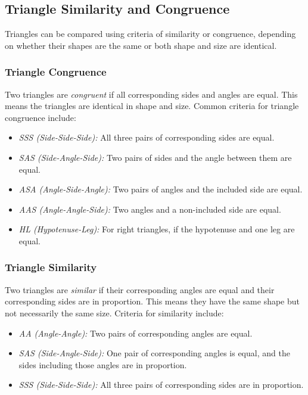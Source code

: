 \subsection{Triangle Similarity and Congruence}

Triangles can be compared using criteria of similarity or congruence, depending on whether their shapes 
are the same or both shape and size are identical.

\subsubsection{Triangle Congruence}

Two triangles are \emph{congruent} if all corresponding sides and angles are equal. This means the 
triangles are identical in shape and size. Common criteria for triangle congruence include:

\begin{itemize}

	\item \emph{SSS (Side-Side-Side):} All three pairs of corresponding sides are equal.

	\item \emph{SAS (Side-Angle-Side):} Two pairs of sides and the angle between them are equal.

	\item \emph{ASA (Angle-Side-Angle):} Two pairs of angles and the included side are equal.

	\item \emph{AAS (Angle-Angle-Side):} Two angles and a non-included side are equal.

	\item \emph{HL (Hypotenuse-Leg):} For right triangles, if the hypotenuse and one leg are equal.

\end{itemize}

\subsubsection{Triangle Similarity}
Two triangles are \emph{similar} if their corresponding angles are equal and their corresponding sides 
are in proportion. This means they have the same shape but not necessarily the same size. Criteria for 
similarity include:

\begin{itemize}

	\item \emph{AA (Angle-Angle):} Two pairs of corresponding angles are equal.

	\item \emph{SAS (Side-Angle-Side):} One pair of corresponding angles is equal, and the sides including 
	those angles are in proportion.

	\item \emph{SSS (Side-Side-Side):} All three pairs of corresponding sides are in proportion.

\end{itemize}

